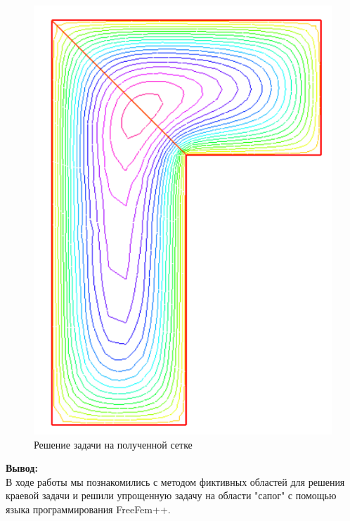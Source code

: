 \documentclass[a4paper, 12pt]{article}%
\begin{document}
	\begin{figure}[H]
		\centering
		\includegraphics[width=0.7\linewidth]{solution.png}
		\caption{Решение задачи на полученной сетке}
	\end{figure}
	
	\textbf{Вывод: }\\
	
	В ходе работы мы познакомились с методом фиктивных областей для решения краевой задачи и решили упрощенную задачу на области "сапог" с помощью языка программирования FreeFem++.
	
	
\end{document}
